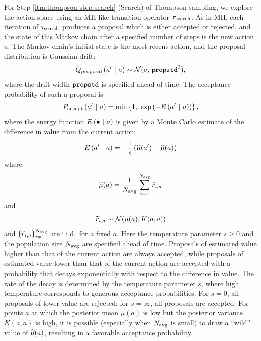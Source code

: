 For Step \ref{itm:thompson-step-search} (Search) of Thompson sampling, we
explore the action space using an MH-like transition operator $\tau_{\textrm{search}}$.
As in MH, each iteration of $\tau_{\textrm{search}}$ produces a proposal which is either
accepted or rejected, and the state of this Markov chain after a specified
number of steps is the new action $a$.  The Markov chain's initial state is the
most recent action, and the proposal distribution is Gaussian drift:
\[ Q_{\textrm{proposal}}\left( a' \ \middle\vert\  a \right) \sim \mathcal{N}(a,\,\texttt{propstd}^2), \]
where the drift width $\texttt{propstd}$ is specified ahead of time.  The acceptance
probability of such a proposal is
\[ P_\accept\pn{a' \mvert a} = \min\br{1,\ \exp\pn{-E\pn{a' \mvert a}}}, \]
where the energy function $E\left( \bullet \ \middle\vert\  a \right)$ is given by a Monte Carlo
estimate of the difference in value from the current action:
\[ E\left( a' \ \middle\vert\  a \right) = -\frac1s \left( \widehat{\mu}(a') - \widehat{\mu}(a) \right) \]
where
\[ \widehat{\mu}(a) = \frac{1}{N_{\textrm{avg}}} \sum_{i=1}^{N_{\textrm{avg}}} \widetilde{r}_{i,a} \]
and
\[ \widetilde{r}_{i,a} \sim \mathcal{N}(\mu(a), K(a,a)) \]
and $\left\{ \widetilde{r}_{i,a} \right\}_{i=1}^{N_{\textrm{avg}}}$ are i.i.d.\ for a fixed $a$.
Here the temperature parameter $s \geq 0$ and the population size $N_{\textrm{avg}}$ are
specified ahead of time.  Proposals of estimated value higher than that of the current action are
always accepted, while proposals of estimated value lower than that of the
current action are accepted with a probability that decays exponentially
with respect to the difference in value.
The rate of the decay is determined by the temperature parameter $s$,
where high temperature corresponds to generous acceptance probabilities.
For $s=0$, all proposals of lower value are rejected; for $s=\infty$, all
proposals are accepted.
For points $a$ at which the posterior mean $\mu(a)$ is low but the
posterior variance $K(a,a)$ is high, it is possible (especially when
$N_{\textrm{avg}}$ is small) to draw a ``wild'' value of $\widehat{\mu}(a)$, resulting in a
favorable acceptance probability.




